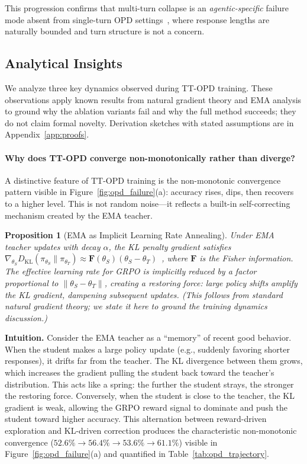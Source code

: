 \documentclass{article}
\newtheorem{proposition}{Proposition}[section]
\begin{document}
This progression confirms that multi-turn collapse is an \emph{agentic-specific} failure mode absent from single-turn OPD settings~\citep{zhao26opsd, yang26rlsd}, where response lengths are naturally bounded and turn structure is not a concern.




\subsection{Analytical Insights}
\label{sec:formal}

We analyze three key dynamics observed during TT-OPD training. These observations apply known results from natural gradient theory and EMA analysis to ground why the ablation variants fail and why the full method succeeds; they do not claim formal novelty. Derivation sketches with stated assumptions are in Appendix~\ref{app:proofs}.

\paragraph{Why does TT-OPD converge non-monotonically rather than diverge?}
A distinctive feature of TT-OPD training is the non-monotonic convergence pattern visible in Figure~\ref{fig:opd_failure}(a): accuracy rises, dips, then recovers to a higher level. This is not random noise---it reflects a built-in self-correcting mechanism created by the EMA teacher.

\begin{proposition}[EMA as Implicit Learning Rate Annealing]
\label{prop:oscillation}
Under EMA teacher updates with decay $\alpha$, the KL penalty gradient satisfies $\nabla_{\theta_S} D_{\mathrm{KL}}(\pi_{\theta_S} \| \pi_{\theta_T}) \approx \mathbf{F}(\theta_S)(\theta_S - \theta_T)$~\citep{amari1998natural}, where $\mathbf{F}$ is the Fisher information. The effective learning rate for GRPO is implicitly reduced by a factor proportional to $\|\theta_S - \theta_T\|$, creating a restoring force: large policy shifts amplify the KL gradient, dampening subsequent updates. (This follows from standard natural gradient theory; we state it here to ground the training dynamics discussion.)
\end{proposition}

\noindent\textbf{Intuition.} Consider the EMA teacher as a ``memory'' of recent good behavior. When the student makes a large policy update (e.g., suddenly favoring shorter responses), it drifts far from the teacher. The KL divergence between them grows, which increases the gradient pulling the student back toward the teacher's distribution. This acts like a spring: the further the student strays, the stronger the restoring force. Conversely, when the student is close to the teacher, the KL gradient is weak, allowing the GRPO reward signal to dominate and push the student toward higher accuracy. This alternation between reward-driven exploration and KL-driven correction produces the characteristic non-monotonic convergence ($52.6\% \to 56.4\% \to 53.6\% \to 61.1\%$) visible in Figure~\ref{fig:opd_failure}(a) and quantified in Table~\ref{tab:opd_trajectory}.
\end{document}

